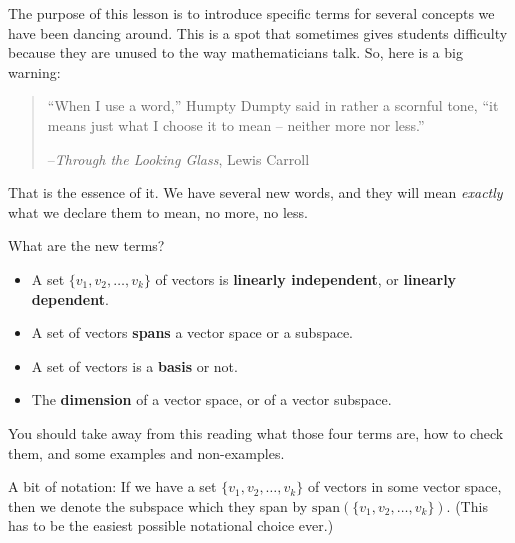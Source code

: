 \documentclass[10pt,]{book}
\newcommand{\terminology}[1]{\textbf{#1}}
\theoremstyle{plain}
\theoremstyle{definition}
\numberwithin{equation}{section}
\begin{document}
      The purpose of this lesson is to introduce specific terms for several
      concepts we have been dancing around. This is a spot that sometimes gives
      students difficulty because they are unused to the way mathematicians
      talk. So, here is a big warning:
\begin{quote}
      
        ``When I use a word,'' Humpty Dumpty said in rather a scornful tone,
        ``it means just what I choose it to mean -- neither more nor less.''

      \par

      --\emph{Through the Looking Glass}, Lewis Carroll%

    \end{quote}\par

      That is the essence of it. We have several new words, and they will
      mean \emph{exactly} what we declare them to mean, no more, no less.
\par

      What are the new terms?
\begin{itemize}
\item{}
        A set \(\{v_1, v_2, \ldots, v_k\}\) of vectors is \terminology{linearly
        independent}, or \terminology{linearly dependent}.
      \item{}
        A set of vectors \terminology{spans} a vector space or a subspace.
      \item{}
        A set of vectors is a \terminology{basis} or not.
      \item{}
        The \terminology{dimension} of a vector space, or of a vector subspace.
      \end{itemize}
\par

      You should take away from this reading what those four terms are, how
      to check them, and some examples and non-examples.
\par

      A bit of notation: If we have a set \(\{ v_1, v_2, \dots, v_k\}\) of
      vectors in some vector space, then we denote the subspace which they
      span by \(\mathrm{span}(\{v_1, v_2, \ldots, v_k\})\). (This has to
      be the easiest possible notational choice ever.)
\typeout{************************************************}
\typeout{************************************************}
\end{document}
